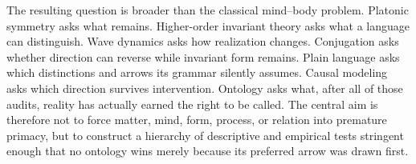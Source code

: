 The resulting question is broader than the classical mind--body problem. Platonic symmetry asks what remains. Higher-order invariant theory asks what a language can distinguish. Wave dynamics asks how realization changes. Conjugation asks whether direction can reverse while invariant form remains. Plain language asks which distinctions and arrows its grammar silently assumes. Causal modeling asks which direction survives intervention. Ontology asks what, after all of those audits, reality has actually earned the right to be called. The central aim is therefore not to force matter, mind, form, process, or relation into premature primacy, but to construct a hierarchy of descriptive and empirical tests stringent enough that no ontology wins merely because its preferred arrow was drawn first.
